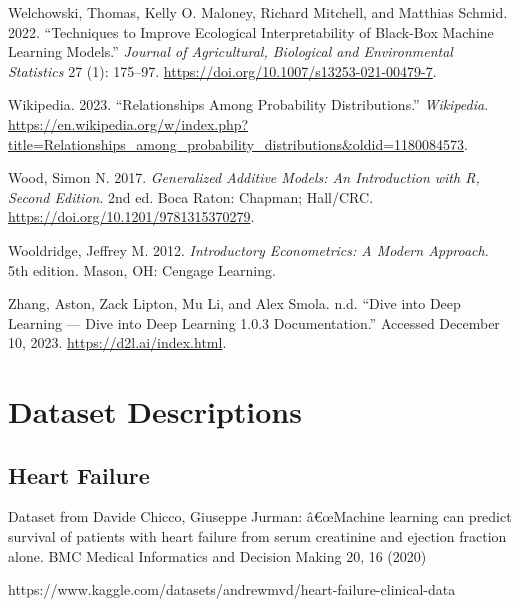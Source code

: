 \documentclass[
  letterpaper,
]{krantz}
\newlength{\cslhangindent}
\newlength{\cslentryspacingunit} %
\newenvironment{CSLReferences}[2] %
 {%
  \setlength{\parindent}{0pt}
  \ifodd #1
  \let\oldpar\par
  \def\par{\hangindent=\cslhangindent\oldpar}
  \fi
  \setlength{\parskip}{#2\cslentryspacingunit}
 }%
 {}
\begin{document}
\begin{CSLReferences}{1}{0}
\leavevmode{}%
Welchowski, Thomas, Kelly O. Maloney, Richard Mitchell, and Matthias
Schmid. 2022. {``Techniques to {Improve} {Ecological} {Interpretability}
of {Black}-{Box} {Machine} {Learning} {Models}.''} \emph{Journal of
Agricultural, Biological and Environmental Statistics} 27 (1): 175--97.
\url{https://doi.org/10.1007/s13253-021-00479-7}.

\leavevmode{}%
Wikipedia. 2023. {``Relationships Among Probability Distributions.''}
\emph{Wikipedia}.
\url{https://en.wikipedia.org/w/index.php?title=Relationships_among_probability_distributions&oldid=1180084573}.

\leavevmode{}%
Wood, Simon N. 2017. \emph{Generalized {Additive} {Models}: {An}
{Introduction} with {R}, {Second} {Edition}}. 2nd ed. Boca Raton:
Chapman; Hall/CRC. \url{https://doi.org/10.1201/9781315370279}.

\leavevmode{}%
Wooldridge, Jeffrey M. 2012. \emph{Introductory {Econometrics}: {A}
{Modern} {Approach}}. 5th edition. Mason, OH: Cengage Learning.

\leavevmode{}%
Zhang, Aston, Zack Lipton, Mu Li, and Alex Smola. n.d. {``Dive into
{Deep} {Learning} --- {Dive} into {Deep} {Learning} 1.0.3
Documentation.''} Accessed December 10, 2023.
\url{https://d2l.ai/index.html}.

\end{CSLReferences}

\chapter{Dataset Descriptions}\label{sec-data-descript}

\section{Heart Failure}\label{sec-dd-hear-failure}

Dataset from Davide Chicco, Giuseppe Jurman: â€œMachine learning can
predict survival of patients with heart failure from serum creatinine
and ejection fraction alone. BMC Medical Informatics and Decision Making
20, 16 (2020)

https://www.kaggle.com/datasets/andrewmvd/heart-failure-clinical-data
\end{document}
